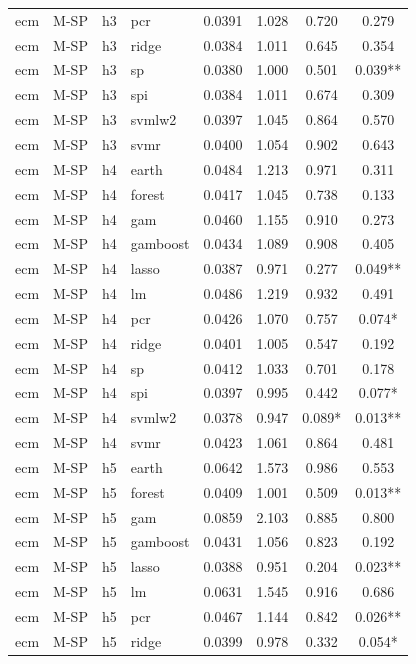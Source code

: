 \begin{ThreePartTable}
\begin{longtable}[t]{llclcccc}
ecm & M-SP & h3 & pcr & 0.0391 & 1.028 & 0.720 & 0.279\\
ecm & M-SP & h3 & ridge & 0.0384 & 1.011 & 0.645 & 0.354\\
ecm & M-SP & h3 & sp & 0.0380 & 1.000 & 0.501 & 0.039**\\
ecm & M-SP & h3 & spi & 0.0384 & 1.011 & 0.674 & 0.309\\
ecm & M-SP & h3 & svmlw2 & 0.0397 & 1.045 & 0.864 & 0.570\\
ecm & M-SP & h3 & svmr & 0.0400 & 1.054 & 0.902 & 0.643\\
\addlinespace
ecm & M-SP & h4 & earth & 0.0484 & 1.213 & 0.971 & 0.311\\
ecm & M-SP & h4 & forest & 0.0417 & 1.045 & 0.738 & 0.133\\
ecm & M-SP & h4 & gam & 0.0460 & 1.155 & 0.910 & 0.273\\
ecm & M-SP & h4 & gamboost & 0.0434 & 1.089 & 0.908 & 0.405\\
ecm & M-SP & h4 & lasso & 0.0387 & 0.971 & 0.277 & 0.049**\\
ecm & M-SP & h4 & lm & 0.0486 & 1.219 & 0.932 & 0.491\\
ecm & M-SP & h4 & pcr & 0.0426 & 1.070 & 0.757 & 0.074*\\
ecm & M-SP & h4 & ridge & 0.0401 & 1.005 & 0.547 & 0.192\\
ecm & M-SP & h4 & sp & 0.0412 & 1.033 & 0.701 & 0.178\\
ecm & M-SP & h4 & spi & 0.0397 & 0.995 & 0.442 & 0.077*\\
ecm & M-SP & h4 & svmlw2 & 0.0378 & 0.947 & 0.089* & 0.013**\\
ecm & M-SP & h4 & svmr & 0.0423 & 1.061 & 0.864 & 0.481\\
\addlinespace
ecm & M-SP & h5 & earth & 0.0642 & 1.573 & 0.986 & 0.553\\
ecm & M-SP & h5 & forest & 0.0409 & 1.001 & 0.509 & 0.013**\\
ecm & M-SP & h5 & gam & 0.0859 & 2.103 & 0.885 & 0.800\\
ecm & M-SP & h5 & gamboost & 0.0431 & 1.056 & 0.823 & 0.192\\
ecm & M-SP & h5 & lasso & 0.0388 & 0.951 & 0.204 & 0.023**\\
ecm & M-SP & h5 & lm & 0.0631 & 1.545 & 0.916 & 0.686\\
ecm & M-SP & h5 & pcr & 0.0467 & 1.144 & 0.842 & 0.026**\\
ecm & M-SP & h5 & ridge & 0.0399 & 0.978 & 0.332 & 0.054*\\

\end{longtable}
\end{ThreePartTable}
